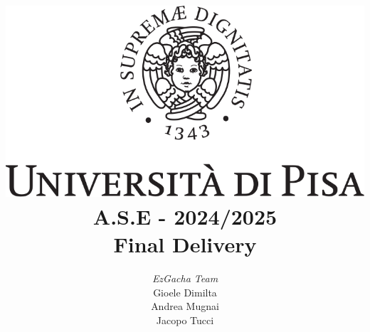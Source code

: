 \documentclass{article}
\begin{document}
\title{\includegraphics[scale=.2]{img/logo-unipi/logo.png} \\[3ex] A.S.E - 2024/2025 \\ Final Delivery}
\author{{\large \emph{EzGacha Team}} \\[1ex] Gioele Dimilta \\ Andrea Mugnai \\ Jacopo Tucci}
\date{}

\maketitle

\newpage
{}
\tableofcontents
\newpage
\end{document}

